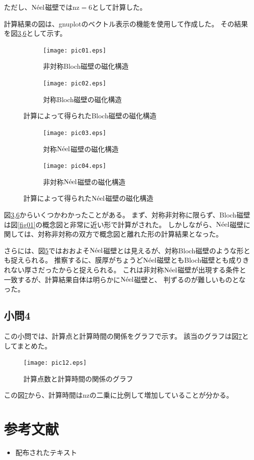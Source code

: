 \documentclass{jsarticle}
\begin{document}
ただし、$\mathrm{N\Acute{e}el}$磁壁では$\mathrm{nz}=6$として計算した。

計算結果の図は、gnuplotのベクトル表示の機能を使用して作成した。
その結果を図\ref{fig06},\ref{fig04}として示す。
\begin{figure}[H]
	\centering
	\begin{subfigure}{0.8\columnwidth}
		\centering
		\texttt{[image: pic01.eps]}
		\caption{非対称Bloch磁壁の磁化構造}
		\label{fig04_1}
	\end{subfigure}
	\begin{subfigure}{0.8\columnwidth}
		\centering
		\texttt{[image: pic02.eps]}
		\caption{対称Bloch磁壁の磁化構造}
		\label{fig04_2}
	\end{subfigure}
	\caption{計算によって得られたBloch磁壁の磁化構造}
	\label{fig06}
\end{figure}

\begin{figure}[H]
	\centering
	\begin{subfigure}{0.8\columnwidth}
		\centering
		\texttt{[image: pic03.eps]}
		\caption{対称$\mathrm{N\Acute{e}el}$磁壁の磁化構造}
		\label{fig04_3}
	\end{subfigure}
	\begin{subfigure}{0.8\columnwidth}
		\centering
		\texttt{[image: pic04.eps]}
		\caption{非対称$\mathrm{N\Acute{e}el}$磁壁の磁化構造}
		\label{fig04_4}
	\end{subfigure}
	\caption{計算によって得られた$\mathrm{N\Acute{e}el}$磁壁の磁化構造}
	\label{fig04}
\end{figure}

図\ref{fig06},\ref{fig04}からいくつかわかったことがある。
まず、対称非対称に限らず、Bloch磁壁は図\ref{fig01}の概念図と非常に近い形で計算がされた。
しかしながら、$\mathrm{N\Acute{e}el}$磁壁に関しては、対称非対称の双方で概念図と離れた形の計算結果となった。

さらには、図\ref{fig04_4}ではおおよそ$\mathrm{N\Acute{e}el}$磁壁とは見えるが、対称Bloch磁壁のような形とも捉えられる。
推察するに、膜厚がちょうど$\mathrm{N\Acute{e}el}$磁壁ともBloch磁壁とも成りきれない厚さだったからと捉えられる。
これは非対称$\mathrm{N\Acute{e}el}$磁壁が出現する条件と一致するが、計算結果自体は明らかに$\mathrm{N\Acute{e}el}$磁壁と、
判ずるのが難しいものとなった。

\subsection{小問4}
この小問では、計算点と計算時間の関係をグラフで示す。
該当のグラフは図\ref{fig05}としてまとめた。
\begin{figure}[H]
	\centering
	\texttt{[image: pic12.eps]}
	\caption{計算点数と計算時間の関係のグラフ}
	\label{fig05}
\end{figure}

この図\ref{fig05}から、計算時間はnzの二乗に比例して増加していることが分かる。


\section{参考文献}
\begin{itemize}
  \item 配布されたテキスト
\end{itemize}
\end{document}

